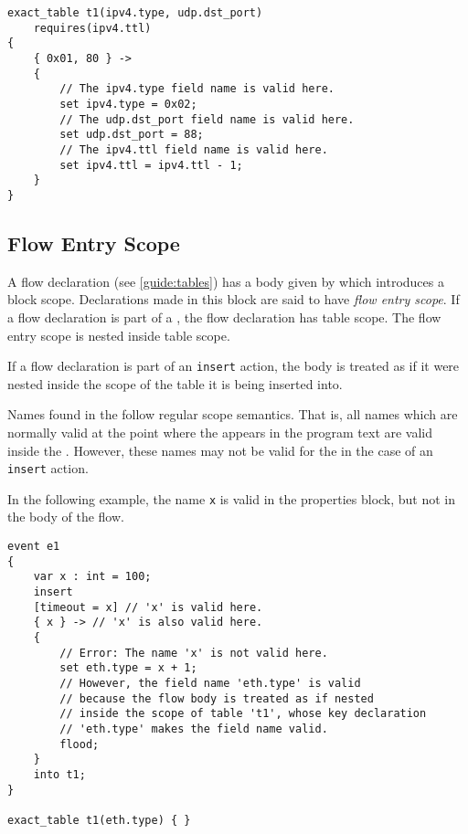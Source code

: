 \begin{minip}
\begin{lstlisting}
exact_table t1(ipv4.type, udp.dst_port)
	requires(ipv4.ttl)
{
	{ 0x01, 80 } ->
	{
		// The ipv4.type field name is valid here.
		set ipv4.type = 0x02;
		// The udp.dst_port field name is valid here.
		set udp.dst_port = 88;
		// The ipv4.ttl field name is valid here.
		set ipv4.ttl = ipv4.ttl - 1;
	}
}
\end{lstlisting}
\end{minip}

\subsection{Flow Entry Scope} \label{guide:flow_scope}

A flow declaration (see \ref{guide:tables}) has a body given by  which introduces a block scope. Declarations made in this block are said to have \textit{flow entry scope}. If a flow declaration is part of a , the flow declaration has table scope. The flow entry scope is nested inside table scope.

If a flow declaration is part of an \texttt{insert} action, the body is treated as if it were nested inside the scope of the table it is being inserted into.

Names found in the  follow regular scope semantics. That is, all names which are normally valid at the point where the  appears in the program text are valid inside the . However, these names may not be valid for the  in the case of an \texttt{insert} action.

In the following example, the name \texttt{x} is valid in the properties block, but not in the body of the flow.

\begin{minip}
\begin{lstlisting}
event e1
{
	var x : int = 100;
	insert
	[timeout = x] // 'x' is valid here.
	{ x } -> // 'x' is also valid here.
	{
		// Error: The name 'x' is not valid here.
		set eth.type = x + 1;
		// However, the field name 'eth.type' is valid
		// because the flow body is treated as if nested
		// inside the scope of table 't1', whose key declaration
		// 'eth.type' makes the field name valid.
		flood;
	}
	into t1;
}

exact_table t1(eth.type) { }
\end{lstlisting}
\end{minip}

